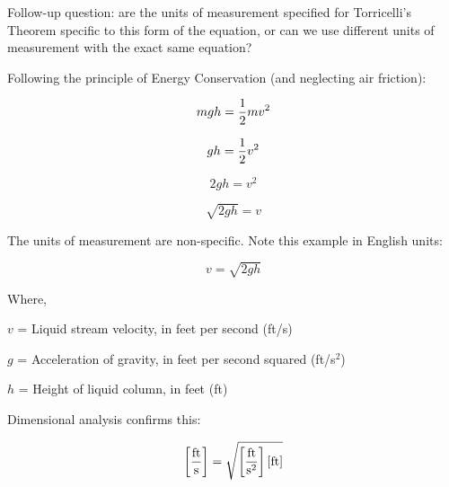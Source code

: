 \vskip 10pt

Follow-up question: are the units of measurement specified for Torricelli's Theorem specific to this form of the equation, or can we use different units of measurement with the exact same equation?







Following the principle of Energy Conservation (and neglecting air friction):

$$mgh = {1 \over 2}mv^2$$

$$gh = {1 \over 2}v^2$$

$$2gh = v^2$$

$$\sqrt{2gh} = v$$

\vskip 10pt

The units of measurement are non-specific.  Note this example in English units:

$$v = \sqrt{2 g h}$$

\noindent
Where,

$v$ = Liquid stream velocity, in feet per second (ft/s)

$g$ = Acceleration of gravity, in feet per second squared (ft/s$^{2}$)

$h$ = Height of liquid column, in feet (ft)

\vskip 10pt

Dimensional analysis confirms this:

$$\left[ \hbox{ft} \over \hbox{s} \right] = \sqrt{\left[ \hbox{ft} \over \hbox{s}^2 \right] \left[ \hbox{ft} \right]}$$




